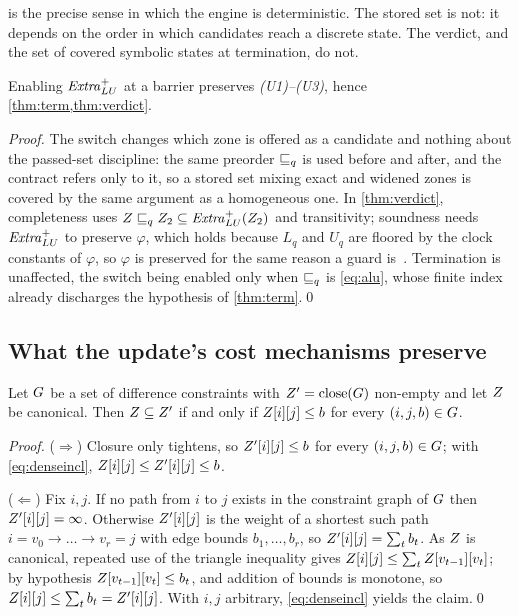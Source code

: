  is the precise sense in which the engine is deterministic.
The stored set is not: it depends on the order in which candidates reach a
discrete state.  The verdict, and the set of covered symbolic states at
termination, do not.

\begin{proposition}\label{prop:adaptive}
Enabling $\mathit{Extra}^{+}_{LU}$ at a barrier preserves \emph{(U1)--(U3)}, hence
\cref{thm:term,thm:verdict}.
\end{proposition}
\begin{proof}
The switch changes which zone is offered as a candidate and nothing about the
passed-set discipline: the same preorder $\sqsubseteq_q$ is used before and after, and
the contract refers only to it, so a stored set mixing exact and widened zones is
covered by the same argument as a homogeneous one.  In \cref{thm:verdict},
completeness uses $Z \sqsubseteq_q Z_2 \subseteq \mathit{Extra}^{+}_{LU}(Z_2)$ and
transitivity; soundness needs $\mathit{Extra}^{+}_{LU}$ to preserve $\varphi$, which holds
because $L_q$ and $U_q$ are floored by the clock constants of $\varphi$, so
$\varphi$ is preserved for the same reason a guard
is~\cite{Behrmann06,Daws98}.  Termination is unaffected, the switch being enabled
only when $\sqsubseteq_q$ is \cref{eq:alu}, whose finite index already discharges the
hypothesis of \cref{thm:term}.\qed
\end{proof}

\subsection{What the update's cost mechanisms preserve}\label{sec:cost}

\begin{lemma}\label{lem:minclosure}
Let $G$ be a set of difference constraints with $Z' = \mathrm{close}(G)$
non-empty and let $Z$ be canonical.  Then $Z \subseteq Z'$ if and
only if $Z[i][j] \le b$ for every $(i,j,b) \in G$.
\end{lemma}
\begin{proof}
($\Rightarrow$)  Closure only tightens, so $Z'[i][j] \le b$ for every
$(i,j,b) \in G$; with \cref{eq:denseincl}, $Z[i][j] \le Z'[i][j] \le
b$.

($\Leftarrow$)  Fix $i,j$.  If no path from $i$ to $j$ exists in the constraint
graph of $G$ then $Z'[i][j] = \infty$.  Otherwise $Z'[i][j]$ is the
weight of a shortest such path $i = v_0 \to \dots \to v_r = j$ with edge bounds
$b_1,\dots,b_r$, so $Z'[i][j] = \sum_t b_t$.  As $Z$ is canonical,
repeated use of the triangle inequality gives $Z[i][j] \le \sum_t
Z[v_{t-1}][v_t]$; by hypothesis $Z[v_{t-1}][v_t] \le b_t$, and addition
of bounds is monotone, so $Z[i][j] \le \sum_t b_t = Z'[i][j]$.  With
$i,j$ arbitrary, \cref{eq:denseincl} yields the claim.\qed
\end{proof}

